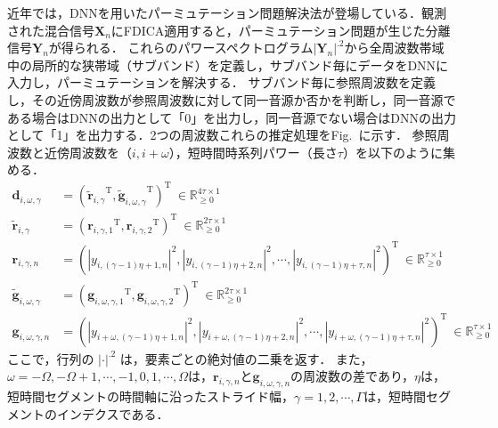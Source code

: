近年では，DNNを用いたパーミュテーション問題解決法が登場している．観測された混合信号$\bm{X}_n$にFDICA適用すると，パーミュテーション問題が生じた分離信号$\bm{Y}_n$が得られる．
これらのパワースペクトログラム$|\bm{Y}_n|^{.2}$から全周波数帯域中の局所的な狭帯域（サブバンド）を定義し，サブバンド毎にデータをDNNに入力し，パーミュテーションを解決する．
サブバンド毎に参照周波数を定義し，その近傍周波数が参照周波数に対して同一音源か否かを判断し，同一音源である場合はDNNの出力として「0」を出力し，同一音源でない場合はDNNの出力として「1」を出力する．2つの周波数これらの推定処理をFig.~に示す．
参照周波数と近傍周波数を（$i,i+\omega$），短時間時系列パワー（長さ$\tau $）を以下のように集める．
\begin{align}
  \bm{d}_{i, \omega, \gamma} &= ({\tilde{\bm{r}}_{i, \gamma}}^\mathrm{T}, {\tilde{\bm{g}}_{i, \omega, \gamma}}^\mathrm{T} )^\mathrm{T}~\in \mathbb{R}_{\geq 0}^{4\tau \times 1} \label{eq:DNNinputVec}\\
  \tilde{\bm{r}}_{i,\gamma} &= ({\bm{r}_{i, \gamma, 1}}^\mathrm{T}, {\bm{r}_{i, \gamma, 2}}^\mathrm{T} )^\mathrm{T}~\in \mathbb{R}_{\geq 0}^{2\tau \times 1} \label{eq:DNNinputVecRtilde}\\
  \bm{r}_{i, \gamma, n} &= ( |y_{i, (\gamma-1) \eta+1, n}|^2, |y_{i, (\gamma-1) \eta+2, n} |^2, 
  \cdots, |y_{i, (\gamma-1) \eta+\tau, n}|^2 )^\mathrm{T}~\in \mathbb{R}_{\geq 0}^{\tau \times 1}  \label{tau1}\\
  \tilde{\bm{g}}_{i,\omega,\gamma} &= ({\bm{g}_{i, \omega, \gamma, 1}}^\mathrm{T}, {\bm{g}_{i, \omega, \gamma, 2}}^\mathrm{T} )^\mathrm{T}~\in \mathbb{R}_{\geq 0}^{2\tau \times 1} \label{eq:DNNinputVecGtilde}\\
  \bm{g}_{i,\omega, \gamma, n} &= ( |y_{i+\omega, (\gamma-1) \eta+1, n}|^2, |y_{i+\omega, (\gamma-1) \eta+2, n}|^2,\cdots, |y_{i+\omega, (\gamma-1) \eta+\tau, n}|^2 )^\mathrm{T}~\in \mathbb{R}_{\geq 0}^{\tau \times 1} \label{tau2}
\end{align}
  ここで，行列の $|\cdot|^{.2}$ は，要素ごとの絶対値の二乗を返す．
  また，$\omega=-\Omega, -\Omega+1, \cdots, -1, 0, 1, \cdots, \Omega$は，$\bm{r}_{i,\gamma,n}$と$\bm{g}_{i,\omega,\gamma,n}$の周波数の差であり，$\eta$は，短時間セグメントの時間軸に沿ったストライド幅，$\gamma=1, 2, \cdots, \Gamma$は，短時間セグメントのインデクスである．
